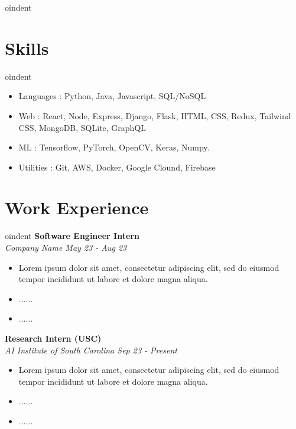 \documentclass{article}
\begin{document}
oindent
\begin{minipage}[t]{0.49\textwidth}

\section*{Skills}

oindent
\begin{itemize}
    \item Languages : Python, Java, Javascript, SQL/NoSQL
    \item Web : React, Node, Express, Django, Flask, HTML, CSS, Redux, Tailwind CSS, MongoDB, SQLite, GraphQL
    \item ML : Tensorflow, PyTorch, OpenCV, Keras, Numpy.
    \item Utilities : Git, AWS, Docker, Google Clound, Firebase 
\end{itemize} 

\vspace{-.1in}

\section*{Work Experience}

oindent
\textbf{Software Engineer Intern}\\
\textit{Company Name \hfill May 23 - Aug 23}
\begin{itemize}
    \item Lorem ipsum dolor sit amet, consectetur adipiscing elit, sed do eiusmod tempor incididunt ut labore et dolore magna aliqua. 
    \item ......
    \item ......
\end{itemize}

\textbf{Research Intern (USC)}\\
\textit{AI Institute of South Carolina \hfill Sep 23 - Present}
\begin{itemize}
   \item Lorem ipsum dolor sit amet, consectetur adipiscing elit, sed do eiusmod tempor incididunt ut labore et dolore magna aliqua. 
    \item ......
    \item ......
\end{itemize}


\end{minipage}
\hspace{0.02\textwidth}%
\end{document}
